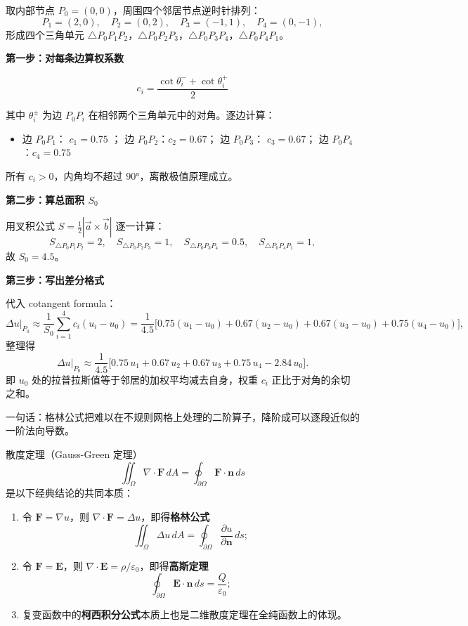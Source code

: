 \begin{example}
取内部节点 $P_0=(0,0)$，周围四个邻居节点逆时针排列：
\[
P_1=(2,0),\quad P_2=(0,2),\quad P_3=(-1,1),\quad P_4=(0,-1),
\]
形成四个三角单元 $\triangle P_0P_1P_2$，$\triangle P_0P_2P_3$，$\triangle P_0P_3P_4$，$\triangle P_0P_4P_1$。

\textbf{第一步：对每条边算权系数}

$$c_i = \frac{\cot\theta_i^- + \cot\theta_i^+}{2}$$

其中 $\theta_i^\pm$ 为边 $P_0P_i$ 在相邻两个三角单元中的对角。逐边计算：

\begin{itemize}
  \item 边 $P_0P_1$： $c_1  = 0.75$ ；
 边 $P_0P_2$：$c_2 = 0.67$；
边 $P_0P_3$： $c_3 =  0.67$；
  边 $P_0P_4$：$c_4 =  0.75$
\end{itemize}

所有 $c_i > 0$，内角均不超过 $90°$，离散极值原理成立。

\textbf{第二步：算总面积 $S_0$}

用叉积公式 $S = \frac{1}{2}|\vec{a}\times\vec{b}|$ 逐一计算：
\[
S_{\triangle P_0P_1P_2}=2,\quad
S_{\triangle P_0P_2P_3}=1,\quad
S_{\triangle P_0P_3P_4}=0.5,\quad
S_{\triangle P_0P_4P_1}=1,
\]
故 $S_0 = 4.5$。

\textbf{第三步：写出差分格式}

代入 cotangent formula：
\[
\Delta u\big|_{P_0}
\approx \frac{1}{S_0}\sum_{i=1}^{4}c_i(u_i-u_0)
= \frac{1}{4.5}\bigl[0.75(u_1-u_0)+0.67(u_2-u_0)
+0.67(u_3-u_0)+0.75(u_4-u_0)\bigr],
\]
整理得
\[
\Delta u\big|_{P_0}
\approx \frac{1}{4.5}\bigl[0.75\,u_1+0.67\,u_2+0.67\,u_3+0.75\,u_4-2.84\,u_0\bigr].
\]
即 $u_0$ 处的拉普拉斯值等于邻居的加权平均减去自身，权重 $c_i$ 正比于对角的余切之和。
\end{example}
\begin{note}
    一句话：格林公式把难以在不规则网格上处理的二阶算子，降阶成可以逐段近似的一阶法向导数。
\end{note}
\begin{theorem}[散度定理的统一性]
散度定理（Gauss-Green 定理）
\[
\iint_{\Omega} \nabla \cdot \mathbf{F} \, dA = \oint_{\partial\Omega} \mathbf{F} \cdot \mathbf{n} \, ds
\]
是以下经典结论的共同本质：
\begin{enumerate}
  \item 令 $\mathbf{F} = \nabla u$，则 $\nabla \cdot \mathbf{F} = \Delta u$，即得\textbf{格林公式}
  \[
  \iint_{\Omega} \Delta u \, dA = \oint_{\partial\Omega} \frac{\partial u}{\partial \mathbf{n}} \, ds;
  \]
  \item 令 $\mathbf{F} = \mathbf{E}$，则 $\nabla \cdot \mathbf{E} = \rho/\varepsilon_0$，即得\textbf{高斯定理}
  \[
  \oint_{\partial\Omega} \mathbf{E} \cdot \mathbf{n} \, ds = \frac{Q}{\varepsilon_0};
  \]
  \item 复变函数中的\textbf{柯西积分公式}本质上也是二维散度定理在全纯函数上的体现。
\end{enumerate}
\end{theorem}
